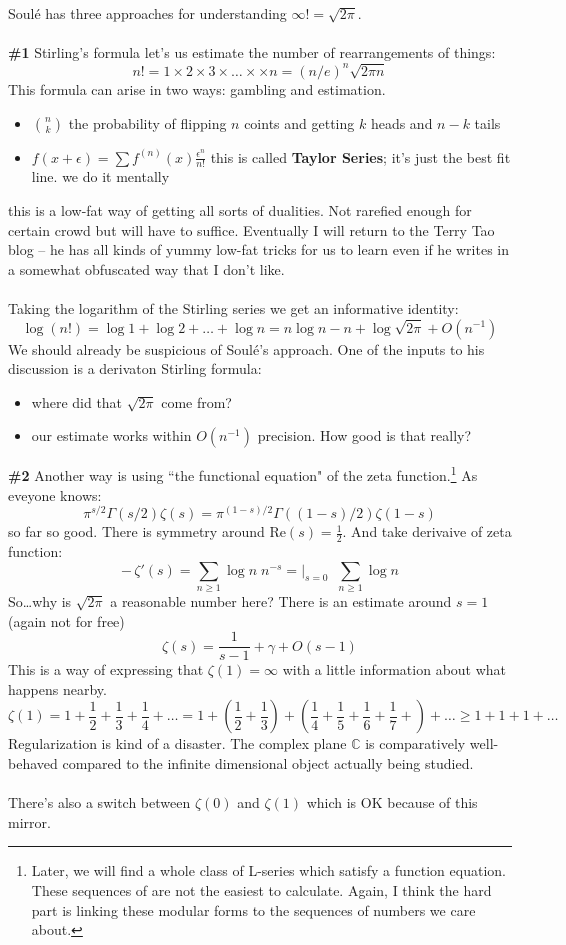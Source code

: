 \documentclass[12pt]{article}
\begin{document}
\noindent Soul\'{e} has three approaches for understanding $\infty! = \sqrt{2\pi}$. \\ \\
\textbf{\#1} Stirling's formula let's us estimate the number of rearrangements of things:
$$  n! = 1 \times 2 \times 3 \times \dots \times \times  n = (n/e)^n \sqrt{2\pi n}$$
This formula can arise in two ways: gambling and estimation.
\begin{itemize}
\item $\binom{n}{k}$ the probability of flipping $n$ coints and getting $k$ heads and $n-k$ tails
\item $f(x + \epsilon) = \sum f^{(n)}(x) \frac{\epsilon^n}{n!}$ this is called \textbf{Taylor Series}; it's just the best fit line. we do it mentally
\end{itemize}
this is a low-fat way of getting all sorts of dualities.  Not rarefied enough for certain crowd but will have to suffice. Eventually I will return to the Terry Tao blog -- he has all kinds of yummy low-fat tricks for us to learn even if he writes in a somewhat obfuscated way that I don't like. \\ \\
Taking the logarithm of the Stirling series we get an informative identity:
$$ \log (n!) = \log 1 + \log 2 + \dots + \log n = n \log n - n + \log \sqrt{2\pi} + O(n^{-1})$$
We should already be suspicious of Soul\'{e}'s approach.  One of the inputs to his discussion is a derivaton Stirling formula: 
\begin{itemize}
\item where did that $\sqrt{2\pi}$ come from? 
\item our estimate works within $O(n^{-1})$ precision.  How good is that really?
\end{itemize}
\textbf{\#2} Another way is using ``the functional equation" of the zeta function.\footnote{Later, we will find a whole class of L-series which satisfy a function equation.  These sequences of are not the easiest to calculate.  Again, I think the hard part is linking these modular forms to the sequences of numbers we care about.}  As eveyone knows:
$$ \pi^{s/2} \Gamma(s/2) \zeta(s) = \pi^{(1-s)/2} \Gamma((1-s)/2)\zeta(1-s) $$ 
so far so good.  There is symmetry around $\mathrm{Re}(s) = \frac{1}{2}$.  And take derivaive of zeta function:
$$ - \, \zeta'(s) =  \sum_{n \geq 1} \log n \; n^{-s} = \Bigg|_{s = 0} \;\; \sum_{n \geq 1} \log n $$
So\dots why is $\sqrt{2\pi}$ a reasonable number here?  There is an estimate around $s=1$ (again not for free)
$$ \zeta(s) = \frac{1}{s-1} + \gamma + O(s-1) $$
This is a way of expressing that $\zeta(1) = \infty$ with a little information about what happens nearby.
$$ \zeta(1) = 1 + \frac{1}{2} + \frac{1}{3} + \frac{1}{4} + \dots = 1 
+ \left( \frac{1}{2} + \frac{1}{3} \right)
+  \left( \frac{1}{4} + \frac{1}{5} + \frac{1}{6} + \frac{1}{7} +\right) + \dots 
\geq 1 + 1 + 1 + \dots $$
Regularization is kind of a disaster.  The complex plane $\mathbb{C}$ is comparatively well-behaved compared to the infinite dimensional object actually being studied. \\ \\
There's also a switch between $\zeta(0)$ and $\zeta(1)$ which is OK because of this mirror. 
\end{document}
